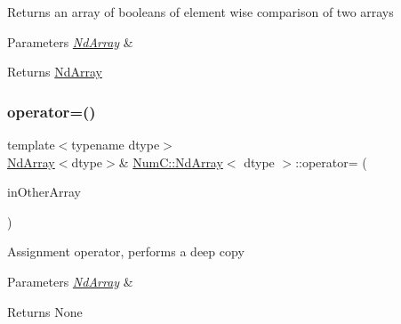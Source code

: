 Returns an array of booleans of element wise comparison of two arrays


\begin{DoxyParams}{Parameters}
{\em \mbox{\hyperlink{class_num_c_1_1_nd_array}{Nd\+Array}}} & \\
\hline
\end{DoxyParams}
\begin{DoxyReturn}{Returns}
\mbox{\hyperlink{class_num_c_1_1_nd_array}{Nd\+Array}} 
\end{DoxyReturn}
\mbox{\label{class_num_c_1_1_nd_array_a77394f32f4c803587139f379ebd738d0}} 
\subsubsection{\texorpdfstring{operator=()}{operator=()}\hspace{0.1cm}{\footnotesize\ttfamily [1/2]}}
{\footnotesize\ttfamily template$<$typename dtype$>$ \\
\mbox{\hyperlink{class_num_c_1_1_nd_array}{Nd\+Array}}$<$dtype$>$\& \mbox{\hyperlink{class_num_c_1_1_nd_array}{Num\+C\+::\+Nd\+Array}}$<$ dtype $>$\+::operator= (\begin{DoxyParamCaption}\item[{const \mbox{\hyperlink{class_num_c_1_1_nd_array}{Nd\+Array}}$<$ dtype $>$ \&}]{in\+Other\+Array }\end{DoxyParamCaption})\hspace{0.3cm}{\ttfamily [inline]}}

Assignment operator, performs a deep copy


\begin{DoxyParams}{Parameters}
{\em \mbox{\hyperlink{class_num_c_1_1_nd_array}{Nd\+Array}}} & \\
\hline
\end{DoxyParams}
\begin{DoxyReturn}{Returns}
None 
\end{DoxyReturn}
\mbox{\label{class_num_c_1_1_nd_array_a7c463b2a87b68f63eeb83c88c55ffbe4}} 
